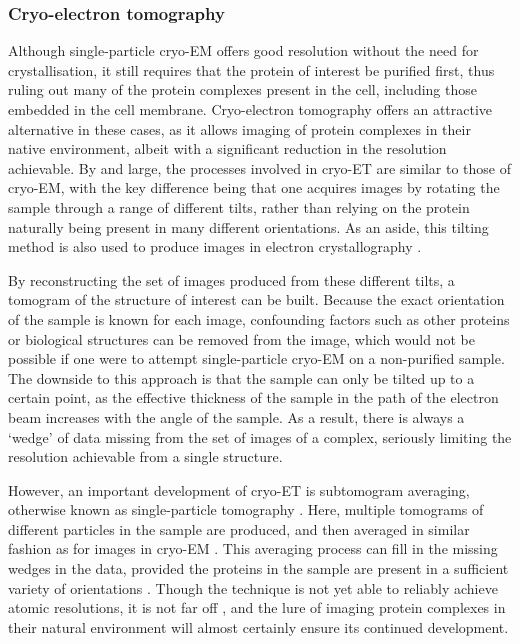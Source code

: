 \documentclass[a4paper,11pt,twoside,openright]{scrbook}
\begin{document}
\subsubsection{Cryo-electron tomography}
Although single-particle cryo-EM offers good resolution without the need for
crystallisation, it still requires that the protein of interest be purified
first, thus ruling out many of the protein complexes present in the cell,
including those embedded in the cell membrane. Cryo-electron tomography offers
an attractive alternative in these cases, as it allows imaging of protein
complexes in their native environment, albeit with a significant reduction in
the resolution achievable. By and large, the processes involved in cryo-ET are
similar to those of cryo-EM, with the key difference being that one acquires
images by rotating the sample through a range of different tilts, rather than
relying on the protein naturally being present in many different orientations.
As an aside, this tilting method is also used to produce images in electron
crystallography \cite{Wisedchaisri2011}.

By reconstructing the set of images produced from these different tilts, a
tomogram of the structure of interest can be built. Because the exact
orientation of the sample is known for each image, confounding factors such as
other proteins or biological structures can be removed from the image, which
would not be possible if one were to attempt single-particle cryo-EM on a
non-purified sample. The downside to this approach is that the sample can only
be tilted up to a certain point, as the effective thickness of the sample in the
path of the electron beam increases with the angle of the sample. As a result,
there is always a `wedge' of data missing from the set of images of a complex,
seriously limiting the resolution achievable from a single structure.

However, an important development of cryo-ET is subtomogram averaging, otherwise
known as single-particle tomography \cite{Galaz-Montoya2017}. Here, multiple
tomograms of different particles in the sample are produced, and then averaged
in similar fashion as for images in cryo-EM \cite{Bharat2016}. This averaging
process can fill in the missing wedges in the data, provided the proteins in the
sample are present in a sufficient variety of orientations
\cite{Leschziner2006}. Though the technique is not yet able to reliably achieve
atomic resolutions, it is not far off \cite{Schur2016}, and the lure of imaging
protein complexes in their natural environment will almost certainly ensure its
continued development.
\end{document}
